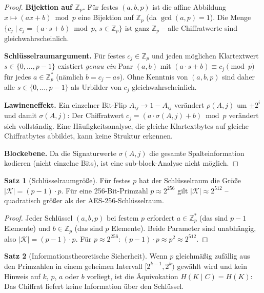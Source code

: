 ﻿\documentclass[a4paper,12pt]{article}
\theoremstyle{definition}
\newtheorem{satz}{Satz}[section]
\begin{document}
\begin{proof}
\textbf{Bijektion auf $\mathbb{Z}_p$.}
Für festes $(a, b, p)$ ist die affine Abbildung $x \mapsto (ax+b) \bmod p$
eine Bijektion auf $\mathbb{Z}_p$ (da $\gcd(a,p) = 1$).
Die Menge $\{c_j \mid c_j = (a\cdot s + b)\bmod p,\, s \in \mathbb{Z}_p\}$
ist ganz $\mathbb{Z}_p$ -- alle Chiffratwerte sind gleichwahrscheinlich.

\textbf{Schlüsselraumargument.}
Für festes $c_j \in \mathbb{Z}_p$ und jeden möglichen Klartextwert
$s \in \{0,\ldots,p-1\}$ existiert \emph{genau ein} Paar $(a, b)$ mit
$(a \cdot s + b) \equiv c_j \pmod{p}$ für jedes $a \in \mathbb{Z}_p^*$
(nämlich $b = c_j - as$). Ohne Kenntnis von $(a, b, p)$ sind daher alle
$s \in \{0,\ldots,p-1\}$ als Urbilder von $c_j$ gleichwahrscheinlich.

\textbf{Lawineneffekt.}
Ein einzelner Bit-Flip $A_{ij} \to 1 - A_{ij}$ verändert $\rho(A,j)$ um
$\pm 2^i$ und damit $\sigma(A,j)$: Der Chiffratwert $c_j = (a\cdot\sigma(A,j) + b)\bmod p$
verändert sich vollständig. Eine Häufigkeitsanalyse, die gleiche Klartextbytes
auf gleiche Chiffratbytes abbildet, kann keine Struktur erkennen.

\textbf{Blockebene.}
Da die Signaturwerte $\sigma(A,j)$ die gesamte Spalteinformation kodieren
(nicht einzelne Bits), ist eine sub-block-Analyse nicht möglich.
\end{proof}

\begin{satz}[Schlüsselraumgröße]
\label{satz:pqc-keyspace}
Für festes $p$ hat der Schlüsselraum die Größe $|\mathcal{K}| = (p-1) \cdot p$.
Für eine 256-Bit-Primzahl $p \approx 2^{256}$ gilt
$|\mathcal{K}| \approx 2^{512}$ -- quadratisch größer als der AES-256-Schlüsselraum.
\end{satz}

\begin{proof}
Jeder Schlüssel $(a, b, p)$ bei festem $p$ erfordert $a \in \mathbb{Z}_p^*$
(das sind $p-1$ Elemente) und $b \in \mathbb{Z}_p$ (das sind $p$ Elemente).
Beide Parameter sind unabhängig, also $|\mathcal{K}| = (p-1) \cdot p$.
Für $p \approx 2^{256}$: $(p-1) \cdot p \approx p^2 \approx 2^{512}$.
\end{proof}

\begin{satz}[Informationstheoretische Sicherheit]
\label{satz:pqc-infotheorie}
Wenn $p$ gleichmäßig zufällig aus den Primzahlen in einem geheimen Intervall
$[2^{k-1}, 2^k)$ gewählt wird und kein Hinweis auf $k$, $p$, $a$ oder $b$ vorliegt,
ist die Äquivokation $H(K \mid C) = H(K)$: Das Chiffrat liefert keine Information
über den Schlüssel.
\end{satz}
\end{document}
